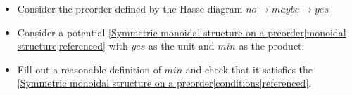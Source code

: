 
\begin{itemize}
    \item  Consider the preorder defined by the Hasse diagram $\boxed{no \rightarrow maybe \rightarrow yes}$
    \item Consider a potential \ref{Symmetric monoidal structure on a preorder|monoidal structure|referenced} with $yes$ as the unit and $min$ as the product.
    \item Fill out a reasonable definition of $min$ and check that it satisfies the \ref{Symmetric monoidal structure on a preorder|conditions|referenced}.
  \end{itemize}